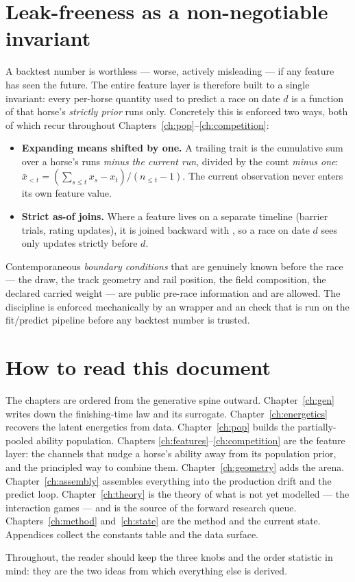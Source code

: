 \section{Leak-freeness as a non-negotiable invariant}

A backtest number is worthless --- worse, actively misleading --- if any feature has seen the
future. The entire feature layer is therefore built to a single invariant: every per-horse
quantity used to predict a race on date $d$ is a function of that horse's \emph{strictly prior}
runs only. Concretely this is enforced two ways, both of which recur throughout
Chapters~\ref{ch:pop}--\ref{ch:competition}:
\begin{itemize}
  \item \textbf{Expanding means shifted by one.} A trailing trait is the cumulative sum over a
        horse's runs \emph{minus the current run}, divided by the count \emph{minus one}:
        $\bar{x}_{<t} = (\sum_{s\le t} x_s - x_t)/(n_{\le t}-1)$. The current observation never
        enters its own feature value.
  \item \textbf{Strict as-of joins.} Where a feature lives on a separate timeline (barrier
        trials, rating updates), it is joined backward with ,
        so a race on date $d$ sees only updates strictly before $d$.
\end{itemize}
Contemporaneous \emph{boundary conditions} that are genuinely known before the race --- the draw,
the track geometry and rail position, the field composition, the declared carried weight --- are
public pre-race information and are allowed. The discipline is enforced mechanically by an
 wrapper and an  check that is run on the fit/predict
pipeline before any backtest number is trusted.

\section{How to read this document}

The chapters are ordered from the generative spine outward. Chapter~\ref{ch:gen} writes down the
finishing-time law and its surrogate. Chapter~\ref{ch:energetics} recovers the latent energetics
from data. Chapter~\ref{ch:pop} builds the partially-pooled ability population. Chapters
\ref{ch:features}--\ref{ch:competition} are the feature layer: the channels that nudge a horse's
ability away from its population prior, and the principled way to combine them.
Chapter~\ref{ch:geometry} adds the arena. Chapter~\ref{ch:assembly} assembles everything into the
production drift and the predict loop. Chapter~\ref{ch:theory} is the theory of what is not yet
modelled --- the interaction games --- and is the source of the forward research queue.
Chapters~\ref{ch:method} and~\ref{ch:state} are the method and the current state. Appendices
collect the constants table and the data surface.

Throughout, the reader should keep the three knobs and the order statistic in mind: they are the
two ideas from which everything else is derived.
